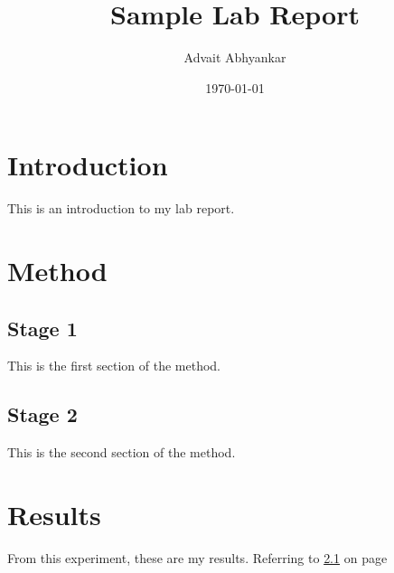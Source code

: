 \documentclass[a4paper,12pt]{article}
\begin{document}
\title{Sample Lab Report}
\author{Advait Abhyankar}
\date{\today}
\maketitle

\section{Introduction}
This is an introduction to my lab report.

\section{Method}

\subsection{Stage 1}
\label{sec1}
This is the first section of the method.

\subsection{Stage 2}
This is the second section of the method.

\section{Results}
From this experiment, these are my results. Referring to \ref{sec1} on page \pageref{sec1}
\end{document}
